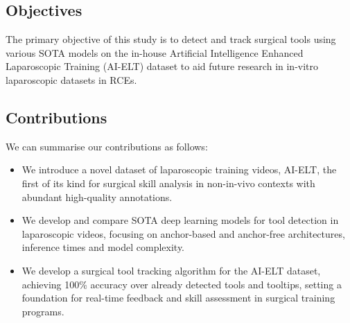 \subsection{Objectives}

The primary objective of this study is to detect and track surgical tools using various SOTA models on the in-house Artificial Intelligence Enhanced Laparoscopic Training (AI-ELT) dataset to aid future research in in-vitro laparoscopic datasets in RCEs.

\subsection{Contributions}

We can summarise our contributions as follows:

\begin{itemize}[noitemsep, left=0pt]
\item We introduce a novel dataset of laparoscopic training videos, AI-ELT, the first of its kind for surgical skill analysis in non-in-vivo contexts with abundant high-quality annotations.
\item We develop and compare SOTA deep learning models for tool detection in laparoscopic videos, focusing on anchor-based and anchor-free architectures, inference times and model complexity.
\item We develop a surgical tool tracking algorithm for the AI-ELT dataset, achieving 100\% accuracy over already detected tools and tooltips, setting a foundation for real-time feedback and skill assessment in surgical training programs.
\end{itemize}

